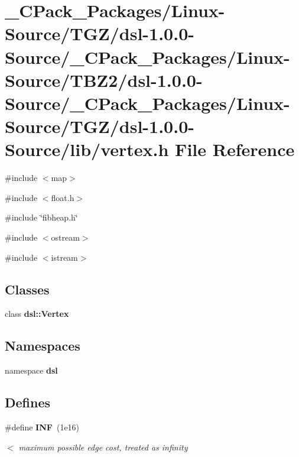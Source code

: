 \section{\_\-CPack\_\-Packages/Linux-\/Source/TGZ/dsl-\/1.0.0-\/Source/\_\-CPack\_\-Packages/Linux-\/Source/TBZ2/dsl-\/1.0.0-\/Source/\_\-CPack\_\-Packages/Linux-\/Source/TGZ/dsl-\/1.0.0-\/Source/lib/vertex.h File Reference}
\label{__CPack__Packages_2Linux-Source_2TGZ_2dsl-1_80_80-Source_2__CPack__Packages_2Linux-Source_2TBZ2_a46db51f0d252d7510d69c4db3d08a08}
{\ttfamily \#include $<$map$>$}\par
{\ttfamily \#include $<$float.h$>$}\par
{\ttfamily \#include \char`\"{}fibheap.h\char`\"{}}\par
{\ttfamily \#include $<$ostream$>$}\par
{\ttfamily \#include $<$istream$>$}\par
\subsection*{Classes}
\begin{DoxyCompactItemize}
\item 
class {\bf dsl::Vertex}
\end{DoxyCompactItemize}
\subsection*{Namespaces}
\begin{DoxyCompactItemize}
\item 
namespace {\bf dsl}
\end{DoxyCompactItemize}
\subsection*{Defines}
\begin{DoxyCompactItemize}
\item 
\#define {\bf INF}~(1e16)
\begin{DoxyCompactList}\small\item\em $<$ maximum possible edge cost, treated as infinity \item\end{DoxyCompactList}\end{DoxyCompactItemize}
